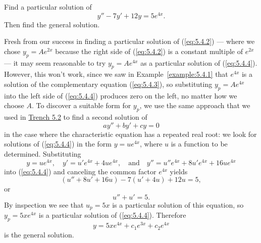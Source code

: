 \documentclass{ximera}
\begin{document}
\begin{example}\label{example:5.4.2}
Find a particular solution of
\begin{equation} \label{eq:5.4.4}
y''-7y'+12y=5e^{4x}.
\end{equation}
Then find the general solution.
 
\begin{explanation}
Fresh from our success in finding a particular solution of
(\ref{eq:5.4.2}) --- where we chose $y_p=Ae^{2x}$ because the right side
of
(\ref{eq:5.4.2}) is a constant multiple of $e^{2x}$ --- it may seem
reasonable to try $y_p=Ae^{4x}$ as a particular solution of
(\ref{eq:5.4.4}). However, this won't work, since we saw in
Example~\ref{example:5.4.1} that $e^{4x}$ is a solution of the
complementary equation (\ref{eq:5.4.3}), so substituting $y_p=Ae^{4x}$
into the left side of (\ref{eq:5.4.4}) produces zero on the left, no
matter how we choose $A$. To discover a suitable form for $y_p$,
we use the same approach that we used in \href{https://ximera.osu.edu/ode/main/constantCoefficientHomogeneousEquations/constantCoefficientHomogeneousEquations}{Trench 5.2} to find a
second solution of
$$
ay''+by'+cy=0
$$
in the case where the characteristic equation has a repeated real
root: we look for solutions of (\ref{eq:5.4.4}) in the form $y=ue^{4x}$,
where $u$ is a function to be determined. Substituting
\begin{equation} \label{eq:5.4.5}
y=ue^{4x},\quad
y'=u'e^{4x}+4ue^{4x},\quad\mbox{and}\quad
y''=u''e^{4x}+8u'e^{4x}+16ue^{4x}
\end{equation}
into (\ref{eq:5.4.4}) and canceling the common factor $e^{4x}$ yields
$$
(u''+8u'+16u)-7(u'+4u)+12u=5,
$$
or
$$
u''+u'=5.
$$
By inspection we  see that $u_p=5x$ is a particular solution of
this equation, so $y_p=5xe^{4x}$ is a particular solution of
(\ref{eq:5.4.4}). Therefore
$$
y=5xe^{4x}+c_1e^{3x}+c_2e^{4x}
$$
is the general solution.
\end{explanation}
\end{example}
 
\end{document}
